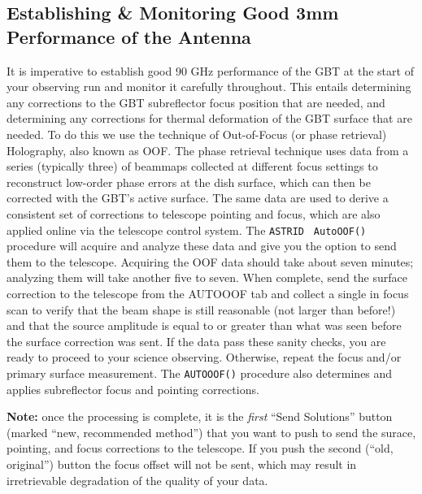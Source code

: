 \subsection{Establishing \& Monitoring Good 3mm Performance of the Antenna}\label{sec:musgbt}

It is imperative to establish good 90 GHz performance of the GBT at
the start of your observing run and monitor it carefully
throughout. This entails determining any corrections to the GBT
subreflector focus position that are needed, and determining any
corrections for thermal deformation of the GBT surface that are
needed.  To do this we use the technique of Out-of-Focus (or phase
retrieval) Holography, also known as OOF. The phase retrieval
technique uses data from a series (typically three) of beammaps
collected at different focus settings to reconstruct low-order phase
errors at the dish surface, which can then be corrected with the GBT's
active surface. The same data are used to derive a consistent set of
corrections to telescope pointing and focus, which are also applied
online via the telescope control system.  The {\tt ASTRID} {\tt
AutoOOF()} procedure will acquire and analyze these data and give you
the option to send them to the telescope. Acquiring the OOF data
should take about seven minutes; analyzing them will take another five
to seven.  When complete, send the surface correction to the telescope
from the AUTOOOF tab and collect a single in focus scan to verify that
the beam shape is still reasonable (not larger than before!) and that
the source amplitude is equal to or greater than what was seen before
the surface correction was sent.  If the data pass these sanity
checks, you are ready to proceed to your science observing. Otherwise,
repeat the focus and/or primary surface measurement. The {\tt AUTOOOF()}
procedure also determines and applies subreflector focus and
pointing corrections.

{\bf Note:} once the processing is complete, it is the {\it first}
``Send Solutions'' button (marked ``new, recommended method'') that
you want to push to send the surace, pointing, and focus corrections
to the telescope. If you push the second (``old, original'') button the
focus offset will not be sent, which may result in irretrievable
degradation of the quality of your data.

